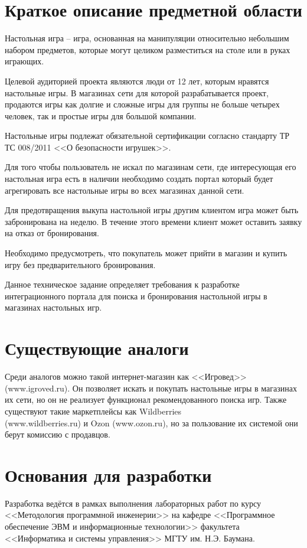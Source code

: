 \section*{Краткое описание предметной области}
Настольная игра -- игра, основанная на манипуляции относительно небольшим набором предметов, которые могут целиком разместиться на столе или в руках играющих.

Целевой аудиторией проекта являются люди от 12 лет, которым нравятся настольные игры. В магазинах сети для которой разрабатывается проект, продаются игры как долгие и сложные игры для группы не больше четырех человек, так и простые игры для большой компании.

Настольные игры подлежат обязательной сертификации согласно стандарту ТР ТС 008/2011 <<О безопасности игрушек>>. 

Для того чтобы пользователь не искал по магазинам сети, где интересующая его настольная игра есть в наличии необходимо создать портал который будет агрегировать все настольные игры во всех магазинах данной сети. 

Для предотвращения выкупа настольной игры другим клиентом игра может быть забронирована на неделю. В течение этого времени клиент может оставить заявку на отказ от бронирования. 

Необходимо предусмотреть, что покупатель может прийти в магазин и купить игру без предварительного бронирования.

Данное техническое задание определяет требования к разработке интеграционного портала для поиска и бронирования настольной игры в магазинах настольных игр.


\section*{Существующие аналоги}

Среди аналогов можно такой интернет-магазин как <<Игровед>>\\ (www.igroved.ru). Он позволяет искать и покупать настольные игры в магазинах их сети, но он не реализует функционал рекомендованного поиска игр. Также существуют такие маркетплейсы как Wildberries \\(www.wildberries.ru) и Ozon (www.ozon.ru), но за пользование их системой они берут комиссию с продавцов. 

\section*{Основания для разработки}
Разработка ведётся в рамках выполнения лабораторных работ по курсу <<Методология программной инженерии>> на кафедре <<Программное обеспечение ЭВМ и информационные технологии>> факультета <<Информатика и системы управления>> МГТУ им. Н.Э. Баумана.

